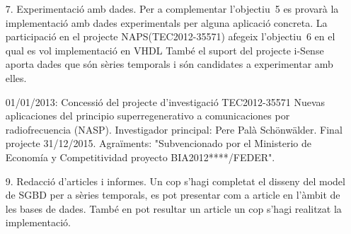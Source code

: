 \begin{itemize}
\item[7.] Experimentació amb dades. Per a complementar l'objectiu~5 es
  provarà la implementació amb dades experimentals per alguna
  aplicació concreta. \todo{}
    La participació en el projecte NAPS(TEC2012-35571) afegeix l'objectiu~6 en el qual es vol  implementació en VHDL
    També el suport del projecte i-Sense aporta dades que són sèries temporals i són candidates a experimentar amb elles.


01/01/2013: Concessió del projecte d'investigació TEC2012-35571 Nuevas
aplicaciones del principio superregenerativo a comunicaciones por
radiofrecuencia (NASP). Investigador principal: Pere Palà Schönwälder. Final
projecte 31/12/2015. Agraïments: "Subvencionado por el  Ministerio de Economía y Competitividad proyecto BIA2012****/FEDER".



\item[9.] Redacció d'articles i informes. Un cop s'hagi completat el
  disseny del model de SGBD per a sèries temporals, es pot presentar
  com a article en l'àmbit de les bases de dades.  També en pot
  resultar un article un cop s'hagi realitzat la implementació.


\end{itemize}




